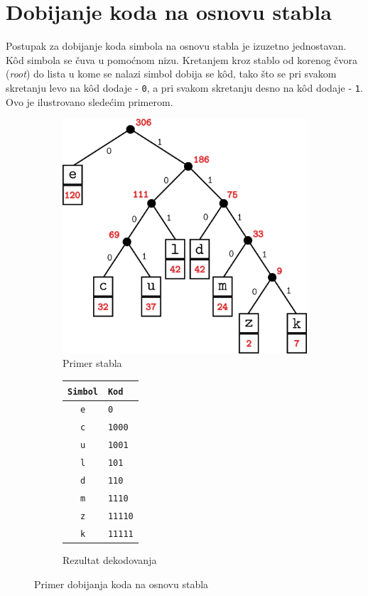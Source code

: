\documentclass[a4paper, 12pt]{article}
\begin{document}
\section*{Dobijanje koda na osnovu stabla}

Postupak za dobijanje koda simbola na osnovu stabla je izuzetno jednostavan. K\^ od simbola se čuva u pomoćnom nizu. Kretanjem kroz stablo od korenog čvora (\textit{root}) do lista u kome se nalazi simbol dobija se k\^ od, tako što se pri svakom skretanju levo na k\^ od dodaje - \verb|0|, a pri svakom skretanju desno na k\^ od dodaje - \verb|1|. Ovo je ilustrovano sledećim primerom.


\begin{figure}[h!]
\centering
\begin{subfigure}{.45\textwidth}
	\centering
	\includegraphics[width=.95\linewidth]{codes}  
	\caption{Primer stabla}
	\label{stablo}
\end{subfigure}
\begin{subfigure}{.45\textwidth}
	\centering
	\begin{tabular}{|c|l|}
	\hline
	\verb|Simbol|	& \verb|Kod|	 \\\hline
	\verb|e|		& \verb|0|		\\\hline
	\verb|c|		& \verb|1000|	\\\hline
	\verb|u|		& \verb|1001|	\\\hline
	\verb|l|		& \verb|101|	\\\hline
	\verb|d|		& \verb|110|	\\\hline
	\verb|m|		& \verb|1110|	\\\hline
	\verb|z|		& \verb|11110|	\\\hline
	\verb|k|		& \verb|11111|	\\\hline
	\end{tabular}
	\caption{Rezultat dekodovanja}
\end{subfigure}
\caption{Primer dobijanja koda na osnovu stabla}
\end{figure}
\end{document}
